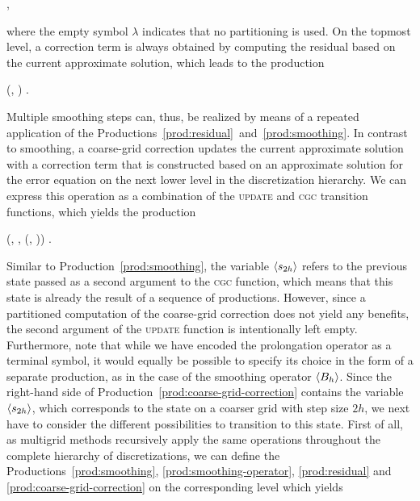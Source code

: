\begin{bnf}
	 {
		 \bnfor \bnfes
	},
\label{prod:partitioning}
\end{bnf}
where the empty symbol $\lambda$ indicates that no partitioning is used. 
On the topmost level, a correction term is always obtained by computing the residual based on the current approximate solution, which leads to the production
\begin{bnf}
	 {
		(, \bnfsp {}) 
	}.
\label{prod:residual}
\end{bnf}
Multiple smoothing steps can, thus, be realized by means of a repeated application of the Productions~\eqref{prod:residual}~and~\eqref{prod:smoothing}.
In contrast to smoothing, a coarse-grid correction updates the current approximate solution with a correction term that is constructed based on an approximate solution for the error equation on the next lower level in the discretization hierarchy.
We can express this operation as a combination of the \textsc{update} and \textsc{cgc} transition functions, which yields the production
\begin{bnf}
	 {
		(\bnfts{$\omega$}, \bnfsp \bnfes, \bnfsp {}(, \bnfsp {}))
	}.
\label{prod:coarse-grid-correction}
\end{bnf}
Similar to Production~\eqref{prod:smoothing}, the variable $\langle s_{2h} \rangle$ refers to the previous state passed as a second argument to the \textsc{cgc} function, which means that this state is already the result of a sequence of productions.
However, since a partitioned computation of the coarse-grid correction does not yield any benefits, the second argument of the \textsc{update} function is intentionally left empty.
Furthermore, note that while we have encoded the prolongation operator as a terminal symbol, it would equally be possible to specify its choice in the form of a separate production, as in the case of the smoothing operator $\langle B_h \rangle$.
Since the right-hand side of Production~\eqref{prod:coarse-grid-correction} contains the variable $\langle s_{2h} \rangle$, which corresponds to the state on a coarser grid with step size $2h$, we next have to consider the different possibilities to transition to this state.
First of all, as multigrid methods recursively apply the same operations throughout the complete hierarchy of discretizations, we can define the Productions~\eqref{prod:smoothing}, \eqref{prod:smoothing-operator}, \eqref{prod:residual} and \eqref{prod:coarse-grid-correction} on the corresponding level which yields
